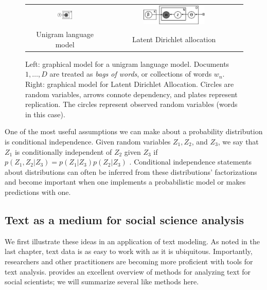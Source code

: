\begin{figure}
  \begin{center}
    \begin{tabular}{cc}
      \includegraphics[width=0.2\textwidth]{chapter_introductory_material/figs/bagofwords_gm.pdf} & 
      \includegraphics[width=0.4667\textwidth]{chapter_introductory_material/figs/lda_gm.pdf} \\
      Unigram language model & Latent Dirichlet allocation \\
    \end{tabular}
  \end{center}
  \caption{Left: graphical model for a unigram language model.
    Documents $1, \ldots, D$ are treated as \emph{bags of words}, or
    collections of words $w_n$.  Right: graphical model for Latent
    Dirichlet Allocation.  Circles are random variables, arrows
    connote dependency, and plates represent replication.  The circles
    represent observed random variables (words in this case).}
  \label{fig:bagofwords_lda_gm}
\end{figure}

One of the most useful assumptions we can make about a probability
distribution is conditional independence.  Given random variables
$Z_1, Z_2$, and $Z_3$, we say that $Z_1$ is conditionally independent
of $Z_2$ given $Z_3$ if $p(Z_1, Z_2 | Z_3) = p(Z_1 | Z_3) p(Z_2 |
Z_3)$ \cite{bishop:2006}.  Conditional independence statements about
distributions can often be inferred from these distributions'
factorizations \cite{bishop:2006} and become important when one
implements a probabilistic model or makes predictions with one.

\subsection{Text as a medium for social science analysis}
  \label{section:text_intro}
  We first illustrate these ideas in an application of text modeling.
  As noted in the last chapter, text data is as easy to work with as
  it is ubiquitous. Importantly, researchers and other practitioners
  are becoming more proficient with tools for text analysis.
  \cite{grimmer:submitted} provides an excellent overview of methods
  for analyzing text for social scientists; we will summarize several
  like methods here.

